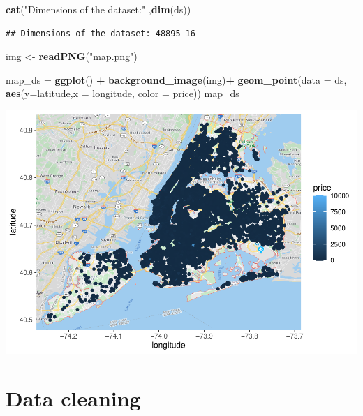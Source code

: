 \documentclass[
]{article}
\newenvironment{Shaded}{\begin{snugshade}}{\end{snugshade}}
\newcommand{\DataTypeTok}[1]{\textcolor[rgb]{0.13,0.29,0.53}{#1}}
\newcommand{\KeywordTok}[1]{\textcolor[rgb]{0.13,0.29,0.53}{\textbf{#1}}}
\newcommand{\NormalTok}[1]{#1}
\newcommand{\OperatorTok}[1]{\textcolor[rgb]{0.81,0.36,0.00}{\textbf{#1}}}
\newcommand{\StringTok}[1]{\textcolor[rgb]{0.31,0.60,0.02}{#1}}
\begin{document}
\begin{Shaded}
\begin{Highlighting}[]
\KeywordTok{cat}\NormalTok{(}\StringTok{"Dimensions of the dataset:"}\NormalTok{ ,}\KeywordTok{dim}\NormalTok{(ds))}
\end{Highlighting}
\end{Shaded}

\begin{verbatim}
## Dimensions of the dataset: 48895 16
\end{verbatim}

\begin{Shaded}
\begin{Highlighting}[]
\NormalTok{img <-}\StringTok{ }\KeywordTok{readPNG}\NormalTok{(}\StringTok{"map.png"}\NormalTok{)}


\NormalTok{map_ds =}\StringTok{ }\KeywordTok{ggplot}\NormalTok{() }\OperatorTok{+}\StringTok{ }\KeywordTok{background_image}\NormalTok{(img)}\OperatorTok{+}\StringTok{ }\KeywordTok{geom_point}\NormalTok{(}\DataTypeTok{data =}\NormalTok{ ds,  }\KeywordTok{aes}\NormalTok{(}\DataTypeTok{y=}\NormalTok{latitude,}\DataTypeTok{x =}\NormalTok{ longitude, }\DataTypeTok{color =}\NormalTok{ price)) }
\NormalTok{map_ds}
\end{Highlighting}
\end{Shaded}

\includegraphics{project-code_files/figure-latex/unnamed-chunk-5-1.pdf}

\hypertarget{data-cleaning}{%
\section{Data cleaning}\label{data-cleaning}}
\end{document}
